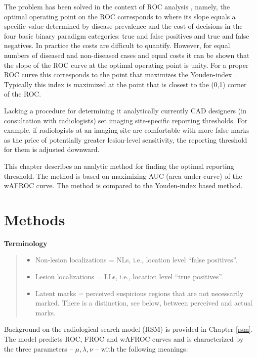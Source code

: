 \documentclass[
]{book}
\providecommand{\tightlist}{%
  \setlength{\itemsep}{0pt}\setlength{\parskip}{0pt}}
\begin{document}
The problem has been solved in the context of ROC analysis \citep{metz1978rocmethodology}, namely, the optimal operating point on the ROC corresponds to where its slope equals a specific value determined by disease prevalence and the cost of decisions in the four basic binary paradigm categories: true and false positives and true and false negatives. In practice the costs are difficult to quantify. However, for equal numbers of diseased and non-diseased cases and equal costs it can be shown that the slope of the ROC curve at the optimal operating point is unity. For a proper ROC curve this corresponds to the point that maximizes the Youden-index \citep{youden1950index}. Typically this index is maximized at the point that is closest to the (0,1) corner of the ROC.

Lacking a procedure for determining it analytically currently CAD designers (in consultation with radiologists) set imaging site-specific reporting thresholds. For example, if radiologists at an imaging site are comfortable with more false marks as the price of potentially greater lesion-level sensitivity, the reporting threshold for them is adjusted downward.

This chapter describes an analytic method for finding the optimal reporting threshold. The method is based on maximizing AUC (area under curve) of the wAFROC curve. The method is compared to the Youden-index based method.

\hypertarget{optim-op-point-methods}{%
\section{Methods}\label{optim-op-point-methods}}

\textbf{Terminology}

\begin{quote}
\begin{itemize}
\tightlist
\item
  Non-lesion localizations = NLs, i.e., location level ``false positives''.
\item
  Lesion localizations = LLs, i.e., location level ``true positives''.
\item
  Latent marks = perceived suspicious regions that are not necessarily marked. There is a distinction, see below, between perceived and actual marks.
\end{itemize}
\end{quote}

Background on the radiological search model (RSM) is provided in Chapter \ref{rsm}. The model predicts ROC, FROC and wAFROC curves and is characterized by the three parameters -- \(\mu, \lambda, \nu\) -- with the following meanings:
\end{document}
